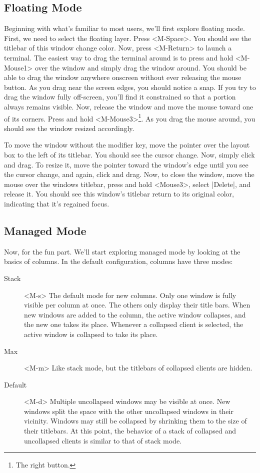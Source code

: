 \subsection{Floating Mode}

Beginning with what's familiar to most users, we'll first explore
floating mode. First, we need to select the floating layer.
Press <M-Space>. You should see the titlebar of this window
change color. Now, press <M-Return> to launch a terminal.
The easiest way to drag the terminal around is to press and hold
<M-Mouse1> over the window and simply drag the window
around. You should be able to drag the window anywhere onscreen
without ever releasing the mouse button. As you drag near the
screen edges, you should notice a snap. If you try to drag the
window fully off-screen, you'll find it constrained so that a
portion always remains visible. Now, release the window and move
the mouse toward one of its corners. Press and hold
<M-Mouse3>\footnote{The right button.}. As you drag the
mouse around, you should see the window resized accordingly.

To move the window without the modifier key, move the pointer
over the layout box to the left of its titlebar. You should see
the cursor change. Now, simply click and drag. To resize it,
move the pointer toward the window's edge until you see the
cursor change, and again, click and drag. Now, to close the
window, move the mouse over the windows titlebar, press and hold
<Mouse3>, select |Delete|, and release it. You should
see this window's titlebar return to its original color,
indicating that it's regained focus.

\subsection{Managed Mode}

Now, for the fun part. We'll start exploring managed mode by
looking at the basics of columns. In the default configuration,
columns have three modes:

\begin{description}
  \item[Stack] <M-s> The default mode for new columns. Only one window
    is fully visible per column at once. The others only display
    their title bars. When new windows are added to the column,
    the active window collapses, and the new one takes its
    place. Whenever a collapsed client is selected, the active
    window is collapsed to take its place.
  \item[Max] <M-m> Like stack mode, but the titlebars of collapsed
    clients are hidden.
  \item[Default] <M-d> Multiple uncollapsed windows may be visible at
    once. New windows split the space with the other uncollapsed
    windows in their vicinity. Windows may still be collapsed by
    shrinking them to the size of their titlebars. At this
    point, the behavior of a stack of collapsed and uncollapsed
    clients is similar to that of stack mode.
\end{description}

